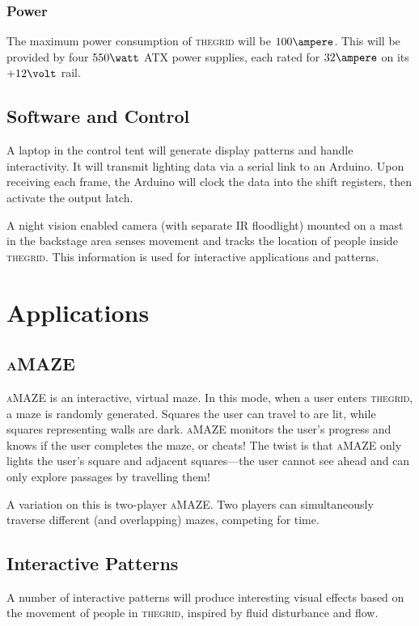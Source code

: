 \documentclass[12pt]{article} %
\newcommand{\thegrid}{\textsc{the\textperiodcentered grid}\xspace}
\newcommand{\amaze}{\textsc{aMAZE}\xspace}
\begin{document}
\subsubsection{Power}
The maximum power consumption of \thegrid will be $100\ampere$.  This will be provided by four $550\watt$ ATX power supplies, each rated for $32\ampere$ on its $+12\volt$ rail.

\subsection{Software and Control}
A laptop in the control tent will generate display patterns and handle interactivity.  It will transmit lighting data via a serial link to an Arduino.  Upon receiving each frame, the Arduino will clock the data into the shift registers, then activate the output latch.

A night vision enabled camera (with separate IR floodlight) mounted on a mast in the backstage area senses movement and tracks the location of people inside \thegrid.  This information is used for interactive applications and patterns.

\section{Applications}
\subsection{\amaze}
\amaze is an interactive, virtual maze.  In this mode, when a user enters \thegrid, a maze is randomly generated.  Squares the user can travel to are lit, while squares representing walls are dark.  \amaze monitors the user's progress and knows if the user completes the maze, or cheats!  The twist is that \amaze only lights the user's square and adjacent squares---the user cannot see ahead and can only explore passages by travelling them!

A variation on this is two-player \amaze.  Two players can simultaneously traverse different (and overlapping) mazes, competing for time.

\subsection{Interactive Patterns}
A number of interactive patterns will produce interesting visual effects based on the movement of people in \thegrid, inspired by fluid disturbance and flow.
\end{document}
